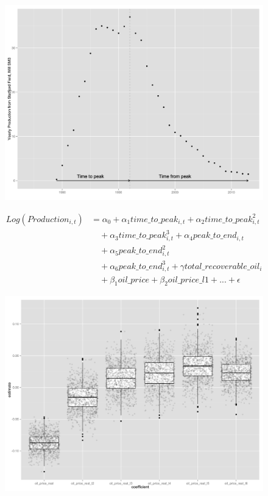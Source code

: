 \documentclass{beamer}
\begin{document}
\begin{frame}
	\begin{figure}
		\includegraphics[width=1\textwidth]{figures/statfjord_dem_print.png}
		\label{statfjord_dem}
	\end{figure}
\end{frame}

\begin{frame}[plain]
	\begin{equation}
		\begin{split}
		 Log(Production_{i,t}) & = \alpha_0 + \alpha_1 time\_to\_peak_{i,t} + \alpha_2 time\_to\_peak_{i,t}^2 \\
		& \quad + \alpha_3 time\_to\_peak_{i,t}^3  + \alpha_4 peak\_to\_end_{i,t} \\
		& \quad + \alpha_5 peak\_to\_end_{i,t}^2 \\
		& \quad + \alpha_6 peak\_to\_end_{i,t}^3 + \gamma total\_recoverable\_oil_i \\
		& \quad + \beta_1 oil\_price + \beta_2 oil\_price\_l1 + ...+ \epsilon
		\end{split}
	\label{glm_eqn}
		\end{equation}
\end{frame}

\begin{frame}[plain]
	\begin{figure}
		\includegraphics[width=.8\textwidth]{figures/glm_dirty_box.png}
		\label{glm_dirty_box}
	\end{figure}
\end{frame}
\end{document}
